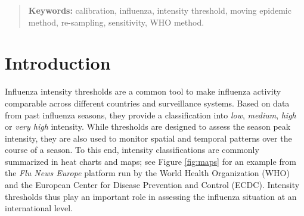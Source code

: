 \documentclass{article}
\begin{document}
\bigskip

\begin{quote}
\textbf{Keywords:} calibration, influenza, intensity threshold, moving epidemic method, re-sampling, sensitivity, WHO method.
\end{quote}

\newpage

%




\section{Introduction}

Influenza intensity thresholds are a common tool to make influenza activity comparable across different countries and surveillance systems. Based on data from past influenza seasons, they provide a classification into \textit{low}, \textit{medium}, \textit{high} or \textit{very high} intensity. While thresholds are designed to assess the season peak intensity, they are also used to monitor spatial and temporal patterns over the course of a season. To this end, intensity classifications are commonly summarized in heat charts and maps; see Figure \ref{fig:maps} for an example from the \textit{Flu News Europe} platform run by the World Health Organization (WHO) and the European Center for Disease Prevention and Control (ECDC). Intensity thresholds thus play an important role in assessing the influenza situation at an international level.
\end{document}
